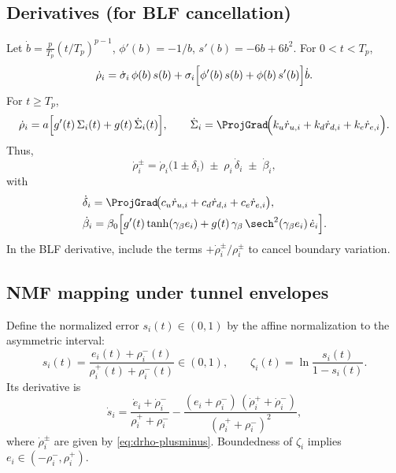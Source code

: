 \documentclass[pdflatex,sn-mathphys-num]{sn-jnl}%
\theoremstyle{thmstyleone}%
\theoremstyle{thmstyletwo}%
\theoremstyle{thmstylethree}%
\begin{document}
\subsection*{Derivatives (for BLF cancellation)}
Let $\dot b=\tfrac{p}{T_p}(t/T_p)^{p-1}$, $\phi'(b)=-1/b$, $s'(b)=-6b+6b^2$. For $0<t<T_p$,
\begin{equation}\label{eq:drho-pre-final}
\dot\rho_i
= \dot\sigma_i\,\phi(b)\,s(b)
+ \sigma_i\Bigl[\phi'(b)\,s(b)+\phi(b)\,s'(b)\Bigr]\dot b.
\end{equation}
For $t\ge T_p$,
\begin{equation}\label{eq:drho-post-final}
\dot\rho_i
= a\Bigl[g'(t)\,\Sigma_i(t)+g(t)\,\dot\Sigma_i(t)\Bigr],\qquad
\dot\Sigma_i=\ProjGrad\!\Bigl(k_u\dot r_{u,i}+k_d\dot r_{d,i}+k_e\dot r_{e,i}\Bigr).
\end{equation}
Thus,
\begin{equation}\label{eq:drho-plusminus}
\dot\rho_i^\pm
= \dot\rho_i\bigl(1\pm\delta_i\bigr)\;\pm\;\rho_i\,\dot\delta_i\;\pm\;\dot\beta_i,
\end{equation}
with
\begin{align}
&\dot\delta_i=\ProjGrad\!\bigl(c_u\dot r_{u,i}+c_d\dot r_{d,i}+c_e\dot r_{e,i}\bigr),\label{eq:ddelta}\\
&\dot\beta_i=\beta_0\Bigl[g'(t)\tanh(\gamma_\beta e_i)+g(t)\,\gamma_\beta\,\sech^2(\gamma_\beta e_i)\,\dot e_i\Bigr].\label{eq:dbeta}
\end{align}
In the BLF derivative, include the terms $+\dot\rho_i^\pm/\rho_i^\pm$ to cancel boundary variation.

\subsection*{NMF mapping under tunnel envelopes}
Define the normalized error $s_i(t)\in(0,1)$ by the affine normalization to the asymmetric interval:
\begin{equation}\label{eq:tunnel-normalization}
s_i(t)=\frac{e_i(t)+\rho_i^-(t)}{\rho_i^+(t)+\rho_i^-(t)}\in(0,1),\qquad
\zeta_i(t)=\ln\!\frac{s_i(t)}{1-s_i(t)}.
\end{equation}
Its derivative is
\begin{equation}\label{eq:dot-s-tunnel}
\dot s_i=\frac{\dot e_i+\dot\rho_i^-}{\rho_i^++\rho_i^-}
-\frac{(e_i+\rho_i^-)\,(\dot\rho_i^++\dot\rho_i^-)}{(\rho_i^++\rho_i^-)^2},
\end{equation}
where $\dot\rho_i^\pm$ are given by \eqref{eq:drho-plusminus}. Boundedness of $\zeta_i$ implies $e_i\in(-\rho_i^-,\rho_i^+)$.
\end{document}
